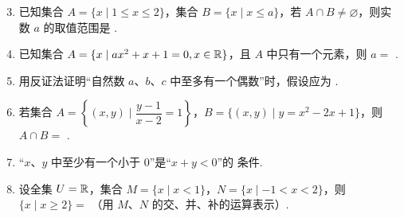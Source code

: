 \documentclass[a4paper,11pt]{article}
\begin{document}


\begin{enumerate}
\setcounter{enumi}{2}
\item 已知集合 $A=\{x\mid 1\le x\le2\}$，集合 $B=\{x\mid x\le a\}$，若 $A\cap B\ne\varnothing$，则实数 $a$ 的取值范围是 \blankline[5.4em].


\ifanswer
\solbegin
{}
\solend
\fi

\item 已知集合 $A=\{x\mid ax^2+x+1=0,x\in\mathbb{R}\}$，且 $A$ 中只有一个元素，则 $a=$ \blankline[4.4em].


\ifanswer
\solbegin
{}
\solend
\fi

\item 用反证法证明“自然数 $a$、$b$、$c$ 中至多有一个偶数”时，假设应为 \blankline[5.4em].


\item 若集合 $A=\left\{(x,y)\mid \dfrac{y-1}{x-2}=1\right\}$，$B=\{(x,y)\mid y=x^2-2x+1\}$，则 $A\cap B=$ \blankline[4.4em].


\ifanswer
\solbegin
{}
\solend
\fi

\item “$x$、$y$ 中至少有一个小于 $0$”是“$x+y<0$”的 \blankline[3.4em] 条件.


\item 设全集 $U=\mathbb{R}$，集合 $M=\{x\mid x<1\}$，$N=\{x\mid -1<x<2\}$，则 $\{x\mid x\ge2\}=$ \blankline[4.4em]（用 $M$、$N$ 的交、并、补的运算表示）.


\end{enumerate}
\end{document}
